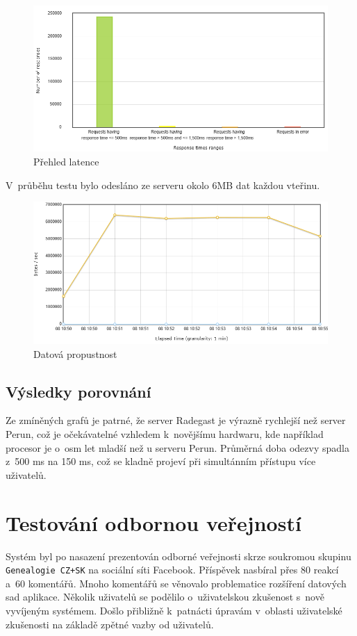 \begin{figure}[htbp]
    \centering
        \includegraphics[scale=.5]{obrazky-figures/testing/performance/radegast/responseTimeOverview.png}
        \caption{Přehled latence}
\end{figure}
\noindent
V~průběhu testu bylo odesláno ze serveru okolo 6MB dat každou vteřinu. 
\begin{figure}[htbp]
    \centering
        \includegraphics[scale=.5]{obrazky-figures/testing/performance/radegast/flotBytesThroughputOverTime.png}
        \caption{Datová propustnost}
\end{figure}

\subsection{Výsledky porovnání}
Ze zmíněných grafů je patrné, že server Radegast je výrazně rychlejší než server Perun, což je očekávatelné vzhledem k~novějšímu hardwaru, kde například procesor je o~osm let mladší než u serveru Perun. Průměrná doba odezvy spadla z~500 ms na 150 ms, což se kladně projeví při simultánním přístupu více uživatelů.

\section{Testování odbornou veřejností}
Systém byl po nasazení prezentován odborné veřejnosti skrze soukromou skupinu \\\texttt{Genealogie CZ+SK} na sociální síti Facebook. Příspěvek nasbíral přes 80 reakcí a~60 komentářů.
Mnoho komentářů se věnovalo problematice rozšíření datových sad aplikace. Několik uživatelů se podělilo o~uživatelskou zkušenost s~nově vyvíjeným systémem. Došlo přibližně k~patnácti úpravám v~oblasti uživatelské zkušenosti na základě zpětné vazby od uživatelů.